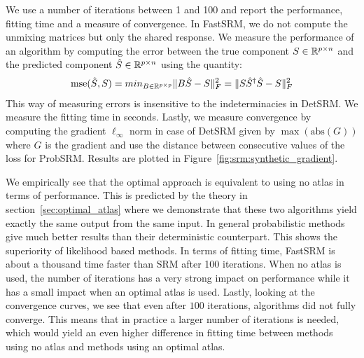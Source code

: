 \documentclass{article}
\begin{document}
We use a number of iterations between 1 and 100 and report the performance,
fitting time and a measure of convergence.
%
In FastSRM, we do not compute the
unmixing matrices but only the shared response.
%
We measure the performance of an algorithm by computing the error between the true component $S \in \mathbb{R}^{p \times n}$ and
the predicted component $\hat{S} \in \mathbb{R}^{p \times n}$ using the quantity:
\begin{align}
\mathrm{mse}(\hat{S}, S) = min_{B \in \mathbb{R}^{p \times p}} \|B \hat{S} - S \|^2_F =  \|S
\hat{S}^{\dagger}\hat{S} - S \|^2_F
\end{align}
%
This way of measuring errors is
insensitive to the indeterminacies in DetSRM.
%
We measure the fitting time in seconds.
%
Lastly, we measure convergence by computing the gradient $\ell_{\infty}$ norm in
case of DetSRM given by $\max(\mathrm{abs}(G))$ where $G$ is the gradient and
use the distance between consecutive values of the loss for ProbSRM.
%
Results are plotted in Figure~\ref{fig:srm:synthetic_gradient}.
%

We empirically see that the optimal approach is equivalent to using no atlas in
terms of performance.
%
This is predicted by the theory in section~\ref{sec:optimal_atlas} where we demonstrate that these two algorithms yield exactly the same output
from the same input.
%
%
In general probabilistic methods give much better results than their deterministic
counterpart.
%
This shows the superiority of likelihood based methods.
%
In terms of fitting time, FastSRM is about a thousand time faster than SRM after
100 iterations.
%
When no atlas is used, the number
of iterations has a very strong impact on performance while it has a small impact
when an optimal atlas is used.
%
Lastly, looking at the convergence curves, we see that even after $100$ iterations, algorithms did
not fully converge.
%
This means that in practice a larger number of
iterations is needed, which would yield an even higher difference in fitting time
between methods using no atlas and methods using an optimal atlas.
%
\end{document}
